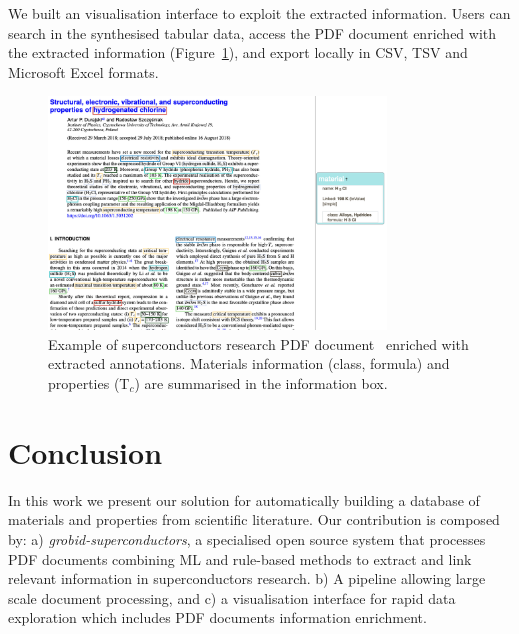\documentclass{article}
\newcommand{\tc}{T$_{c}$}
\begin{document}

We built an visualisation interface to exploit the extracted information. 
Users can search in the synthesised tabular data, access the PDF document enriched with the extracted information (Figure~\ref{fig:pdf-annotations}), and export locally in CSV, TSV and Microsoft Excel formats. 

\begin{figure}[ht]
\centering
\includegraphics[width=0.8\textwidth]{sample-pdf-annotations}
\caption{\label{fig:pdf-annotations} Example of superconductors research PDF document~\cite{sample_superconductors_article} enriched with extracted annotations. Materials information (class, formula) and properties (\tc) are summarised in the information box. }
\end{figure}

\section{Conclusion}
\label{sec:conclusion}
In this work we present our solution for automatically building a database of materials and properties from scientific literature. 
Our contribution is composed by: a) \textit{grobid-superconductors}, a specialised open source system that processes PDF documents combining ML and rule-based methods to extract and link relevant information in superconductors research.
b) A pipeline allowing large scale document processing, and c) a visualisation interface for rapid data exploration which includes PDF documents information enrichment. 
\end{document}
